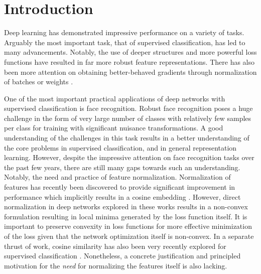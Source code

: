 \documentclass[10pt,twocolumn,letterpaper]{article}
\begin{document}







\section{Introduction}



Deep learning has demonstrated impressive performance on a variety of tasks. Arguably the most important task, that of supervised classification, has led to many advancements. Notably, the use of deeper structures  \cite{simonyan2014very, szegedy2015going, he2016deep} and more powerful loss functions \cite{hadsell2006dimensionality, schroff2015facenet, wen2016discriminative, tadmor2016learning, liu2016large} have resulted in far more robust feature representations.  There has also been more attention on obtaining better-behaved gradients through normalization of batches or weights \cite{ioffe2015batch, ba2016layer, salimans2016weight}. 



One of the most important practical applications of deep networks with supervised classification is face recognition. Robust face recognition poses a huge challenge in the form of very large number of classes with relatively few samples per class for training with significant nuisance transformations. A good understanding of the challenges in this task results in a better understanding of the core problems in supervised classification, and in general representation learning. However, despite the impressive attention on face recognition tasks over the past few years, there are still many gaps towards such an understanding. Notably, the need and practice of feature normalization. Normalization of features has recently been discovered to provide significant improvement in performance which implicitly results in a cosine embedding \cite{ranjan2017l2, Wang2017NormFace}. However, direct normalization in deep networks explored in these works results in a non-convex formulation resulting in local minima generated by the loss function itself. It is important to preserve convexity in loss functions for more effective minimization of the loss given that the network optimization itself is non-convex.  In a separate thrust of work, cosine similarity has also been very recently explored for supervised classification \cite{liu2017learning, chunjie2017cosine}. Nonetheless, a concrete justification and principled motivation for the \textit{need} for normalizing the features itself is also lacking.
\end{document}
